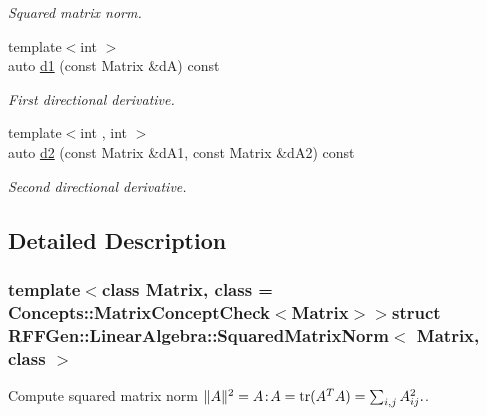 \begin{DoxyCompactItemize}
\begin{DoxyCompactList}\small\item\em Squared matrix norm. \end{DoxyCompactList}\item 
\hypertarget{structRFFGen_1_1LinearAlgebra_1_1SquaredMatrixNorm_ae27b37478ba3e246f73d8383e11c1f84}{{\footnotesize template$<$int $>$ }\\auto \hyperlink{structRFFGen_1_1LinearAlgebra_1_1SquaredMatrixNorm_ae27b37478ba3e246f73d8383e11c1f84}{d1} (const Matrix \&d\-A) const }\label{structRFFGen_1_1LinearAlgebra_1_1SquaredMatrixNorm_ae27b37478ba3e246f73d8383e11c1f84}

\begin{DoxyCompactList}\small\item\em First directional derivative. \end{DoxyCompactList}\item 
\hypertarget{structRFFGen_1_1LinearAlgebra_1_1SquaredMatrixNorm_aaf6162ac724beec933f9f531e2a353f1}{{\footnotesize template$<$int , int $>$ }\\auto \hyperlink{structRFFGen_1_1LinearAlgebra_1_1SquaredMatrixNorm_aaf6162ac724beec933f9f531e2a353f1}{d2} (const Matrix \&d\-A1, const Matrix \&d\-A2) const }\label{structRFFGen_1_1LinearAlgebra_1_1SquaredMatrixNorm_aaf6162ac724beec933f9f531e2a353f1}

\begin{DoxyCompactList}\small\item\em Second directional derivative. \end{DoxyCompactList}\end{DoxyCompactItemize}


\subsection{Detailed Description}
\subsubsection*{template$<$class Matrix, class = Concepts\-::\-Matrix\-Concept\-Check$<$\-Matrix$>$$>$struct R\-F\-F\-Gen\-::\-Linear\-Algebra\-::\-Squared\-Matrix\-Norm$<$ Matrix, class $>$}

Compute squared matrix norm $ \|A\|^2 = A\negthinspace : \negthinspace A = \mathrm{tr}(A^TA) = \sum_{i,j} A_{ij}^2. $. 

